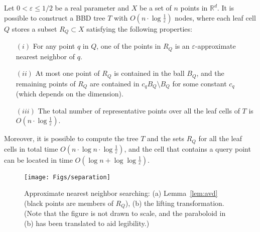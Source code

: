 \documentclass[11pt]{article}   \usepackage[letterpaper,hmargin=2.1cm,vmargin=3cm]{geometry}
\newcommand{\RE}{\mathbb{R}}    \newcommand{\ZZ}{\mathbb{Z}}    \newcommand{\eps}{\varepsilon}  \newcommand{\ST}{\,:\,}         \newcommand{\sq}{\square}
\newcommand{\inv}[1]{\frac{1}{#1}}
\begin{document}
\begin{lemma} \label{lem:avd}
Let $0 < \eps \leq 1/2$ be a real parameter and $X$ be a set of $n$ points in $\RE^d$. It is possible to construct a BBD tree $T$ with $O(n \cdot \log \inv{\eps})$ nodes, where each leaf cell $Q$ stores a subset $R_Q \subset X$ satisfying the following properties:

\begin{enumerate}
\setlength{\itemsep}{-0.5ex}\setlength{\parsep}{0pt}\item[$(i)$] For any point $q$ in $Q$, one of the points in $R_Q$ is an $\eps$-approximate nearest neighbor of $q$.

\item[$(ii)$] At most one point of $R_Q$ is contained in the ball $B_Q$, and the remaining points of $R_Q$ are contained in $c_q B_Q \setminus B_Q$ for some constant $c_q$ (which depends on the dimension).

\item[$(iii)$] The total number of representative points over all the leaf cells of $T$ is $O(n \cdot \log \inv{\eps})$.
\end{enumerate}

Moreover, it is possible to compute the tree $T$ and the sets $R_Q$ for all the leaf cells in total time $O(n \cdot \log n \cdot \log \inv{\eps})$, and the cell that contains a query point can be located in time $O(\log n + \log \log \inv{\eps})$.
\end{lemma}


\begin{figure}[htbp]
  \centerline{\texttt{[image: Figs/separation]}}
  \caption{Approximate nearest neighbor searching: (a) Lemma~\ref{lem:avd} (black points are members of $R_Q$), (b) the lifting transformation. (Note that the figure is not drawn to scale, and the paraboloid in (b) has been translated to aid legibility.)}
  \label{fig:separation}
\end{figure}
\end{document}
